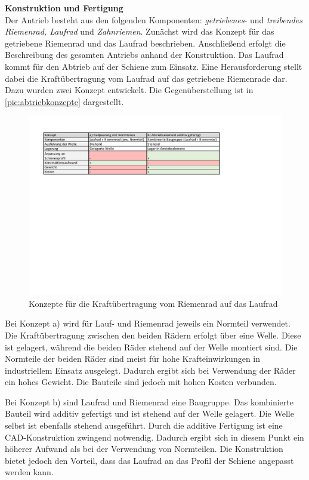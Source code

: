 \textbf{Konstruktion und Fertigung}\\
Der Antrieb besteht aus den folgenden Komponenten: \textit{getriebenes}- und \textit{treibendes Riemenrad, Laufrad} und \textit{Zahnriemen}. Zunächst wird das Konzept für das getriebene Riemenrad und das Laufrad beschrieben. Anschließend erfolgt die Beschreibung des gesamten Antriebs anhand der Konstruktion.  
Das Laufrad kommt für den Abtrieb auf der Schiene zum Einsatz. Eine Herausforderung stellt dabei die Kraftübertragung vom Laufrad auf das getriebene Riemenrade dar. Dazu wurden zwei Konzept entwickelt. Die Gegenüberstellung ist in \autoref{pic:abtriebkonzepte} dargestellt.
\newpage

\begin{figure}[h]
	\begin{center}
		\includegraphics[width=17cm]{abtriebkonzepte.pdf}
		\caption{Konzepte für die Kraftübertragung vom Riemenrad auf das Laufrad}
		\label{pic:abtriebkonzepte}
	\end{center}
\end{figure}


Bei Konzept a) wird für Lauf- und Riemenrad jeweils ein Normteil verwendet. Die Kraftübertragung zwischen den beiden Rädern erfolgt über eine Welle. Diese ist gelagert, während die beiden Räder stehend auf der Welle montiert sind. Die Normteile der beiden Räder sind meist für hohe Krafteinwirkungen in industriellem Einsatz ausgelegt. Dadurch ergibt sich bei Verwendung der Räder ein hohes Gewicht. Die Bauteile sind jedoch mit hohen Kosten verbunden.

Bei Konzept b) sind Laufrad und Riemenrad eine Baugruppe. Das kombinierte Bauteil wird additiv gefertigt und ist stehend auf der Welle gelagert. Die Welle selbst ist ebenfalls stehend ausgeführt. Durch die additive Fertigung ist eine CAD-Konstruktion zwingend notwendig. Dadurch ergibt sich in diesem Punkt ein höherer Aufwand als bei der Verwendung von Normteilen. Die Konstruktion bietet jedoch den Vorteil, dass das Laufrad an das Profil der Schiene angepasst werden kann. 

